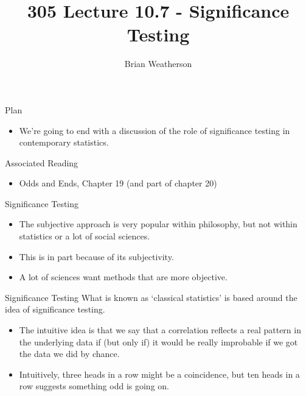 \documentclass[
  ignorenonframetext,
]{beamer}
\title{305 Lecture 10.7 - Significance Testing}
\author{Brian Weatherson}
\date{}
\providecommand{\tightlist}{%
  \setlength{\itemsep}{0pt}\setlength{\parskip}{0pt}}
\renewcommand{\,}{\text{, }}
\begin{document}
\frame{\titlepage}

\begin{frame}{Plan}
\protect\hypertarget{plan}{}
\begin{itemize}
\tightlist
\item
  We're going to end with a discussion of the role of significance
  testing in contemporary statistics.
\end{itemize}
\end{frame}

\begin{frame}{Associated Reading}
\protect\hypertarget{associated-reading}{}
\begin{itemize}
\tightlist
\item
  Odds and Ends, Chapter 19 (and part of chapter 20)
\end{itemize}
\end{frame}

\begin{frame}{Significance Testing}
\protect\hypertarget{significance-testing}{}
\begin{itemize}
\tightlist
\item
  The subjective approach is very popular within philosophy, but not
  within statistics or a lot of social sciences.
\item
  This is in part because of its subjectivity.
\item
  A lot of sciences want methods that are more objective.
\end{itemize}
\end{frame}

\begin{frame}{Significance Testing}
\protect\hypertarget{significance-testing-1}{}
What is known as `classical statistics' is based around the idea of
significance testing.

\begin{itemize}
\tightlist
\item
  The intuitive idea is that we say that a correlation reflects a real
  pattern in the underlying data if (but only if) it would be really
  improbable if we got the data we did by chance.
\item
  Intuitively, three heads in a row might be a coincidence, but ten
  heads in a row suggests something odd is going on.
\end{itemize}
\end{frame}
\end{document}
